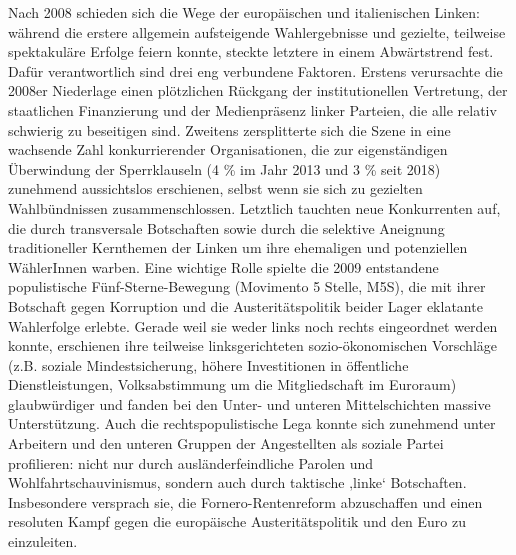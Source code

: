 \begin{multicols*}{2}
 \noindent   Nach 2008 schieden sich die Wege der europäischen und italienischen Linken: während die erstere allgemein aufsteigende Wahlergebnisse und gezielte, teilweise spektakuläre Erfolge feiern konnte, steckte letztere in einem Abwärtstrend fest. Dafür verantwortlich sind drei eng verbundene Faktoren. Erstens verursachte die 2008er Niederlage einen plötzlichen Rückgang der institutionellen Vertretung, der staatlichen Finanzierung und der Medienpräsenz linker Parteien, die alle relativ schwierig zu beseitigen sind. Zweitens zersplitterte sich die Szene in eine wachsende Zahl konkurrierender Organisationen, die zur eigenständigen Überwindung der Sperrklauseln (4 \% im Jahr 2013 und 3 \% seit 2018) zunehmend aussichtslos erschienen, selbst wenn sie sich zu gezielten Wahlbündnissen zusammenschlossen. Letztlich tauchten neue Konkurrenten auf, die durch transversale Botschaften sowie durch die selektive Aneignung traditioneller Kernthemen der Linken um ihre ehemaligen und potenziellen WählerInnen warben. Eine wichtige Rolle spielte die 2009 entstandene populistische Fünf-Sterne-Bewegung (Movimento 5 Stelle, M5S), die mit ihrer Botschaft gegen Korruption und die Austeritätspolitik beider Lager eklatante Wahlerfolge erlebte. Gerade weil sie weder links noch rechts eingeordnet werden konnte, erschienen ihre teilweise linksgerichteten sozio-ökonomischen Vorschläge (z.B. soziale Mindestsicherung, höhere Investitionen in öffentliche Dienstleistungen, Volksabstimmung um die Mitgliedschaft im Euroraum) glaubwürdiger und fanden bei den Unter- und unteren Mittelschichten massive Unterstützung. Auch die rechtspopulistische Lega konnte sich zunehmend unter Arbeitern und den unteren Gruppen der Angestellten als soziale Partei profilieren: nicht nur durch ausländerfeindliche Parolen und Wohlfahrtschauvinismus, sondern auch durch taktische ‚linke‘ Botschaften. Insbesondere versprach sie, die Fornero-Rentenreform abzuschaffen und einen resoluten Kampf gegen die europäische Austeritätspolitik und den Euro zu einzuleiten.\par


\end{multicols*}
